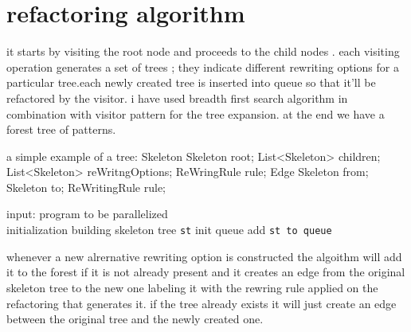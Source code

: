 \documentclass[12pt]{report}
\begin{document}
\section{refactoring algorithm}
it starts by visiting the root node and proceeds to the child nodes . each visiting operation generates a set of trees ; they indicate different rewriting options for a particular tree.each newly created tree is inserted into queue so that it'll be refactored by the visitor. i have used breadth first search algorithm in combination with visitor pattern for the tree expansion. at the end we have a forest tree of patterns.

a simple example of a tree:
	Skeleton {
		Skeleton root;
		List<Skeleton> children;
		List<Skeleton> reWritngOptions;
		ReWringRule rule;
	}
	Edge{
		Skeleton from;
		Skeleton to;
		ReWritingRule rule;
	}
	
%	


\begin{algorithm}[H]
  input: program to be parallelized\\
  initialization\;
  building skeleton tree \texttt{st}\;
  init queue\;
  add \texttt{st to queue}\\
 
\end{algorithm}
whenever a new alrernative rewriting option is constructed the algoithm will add it to the forest if it is not already present and it creates an edge from the original skeleton tree to the new one labeling it with the rewring rule applied on the refactoring that generates it. if the tree already exists it will just create an edge between the original tree and the newly created one. 
\end{document}
